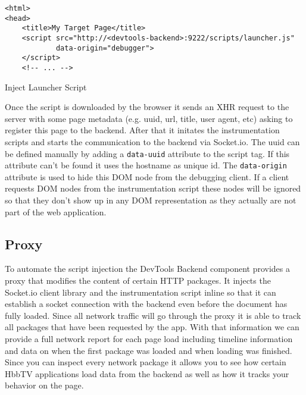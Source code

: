 \vspace{0.3cm}
\begin{listing}[H]
\begin{verbatim}
<html>
<head>
    <title>My Target Page</title>
    <script src="http://<devtools-backend>:9222/scripts/launcher.js"
            data-origin="debugger">
    </script>
    <!-- ... -->
\end{verbatim}
\caption{Inject Launcher Script}
\label{lst:launcher}
\end{listing}

Once the script is downloaded by the browser it sends an XHR request to the server with some page metadata
(e.g. uuid, url, title, user agent, etc) asking to register this page to the backend. After that it
initates the instrumentation scripts and starts the communication to the backend via Socket.io. The uuid
can be defined manually by adding a \texttt{data-uuid} attribute to the script tag. If this attribute
can't be found it uses the hostname as unique id. The \texttt{data-origin} attribute is used to hide this
DOM node from the debugging client. If a client requests DOM nodes from the instrumentation script these
nodes will be ignored so that they don't show up in any DOM representation as they actually are not part
of the web application.

\subsection{Proxy\label{sec:proxy}}

To automate the script injection the DevTools Backend component provides a proxy that modifies the content
of certain HTTP packages. It injects the Socket.io client library and the instrumentation script inline so
that it can establish a socket connection with the backend even before the document has fully loaded.
Since all network traffic will go through the proxy it is able to track all packages that have been
requested by the app. With that information we can provide a full network report for each page load
including timeline information and data on when the first package was loaded and when loading was finished.
Since you can inspect every network package it allows you to see how certain HbbTV applications load data
from the backend as well as how it tracks your behavior on the page.

